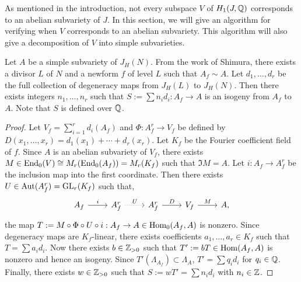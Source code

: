 \documentclass{article}
\begin{document}
As mentioned in the introduction, not every subspace $V$ of $H_1(J, \mathbb{Q})$
corresponds to an abelian subvariety of $J$. In this section, we will give an
algorithm for verifying when $V$ corresponds to an abelian subvariety. This
algorithm will also give a decomposition of $V$ into simple subvarieties.


\begin{proposition}
    \label{prop:integral_degen}
    Let $A$ be a simple subvariety of $J_H(N)$. From the work of Shimura,
    there exists a divisor $L$ of $N$ and a newform $f$ of level $L$ such that
    $A_f \sim A$. Let $d_1,\ldots,d_r$ be the full collection of degeneracy
    maps from $J_H(L)$ to $J_H(N)$. Then there exists integers $n_1,\ldots,n_r$
    such that $S:=\sum n_i d_i: A_f\to A$ is an isogeny from $A_f$ to $A$. Note
    that $S$ is defined over $\mathbb{Q}$.
\end{proposition}
\begin{proof}
    Let $V_f=\sum_{i=1} ^r d_i(A_f)$ and $\Phi:A_f ^r \to V_f$ be defined by
    $D(x_1,\ldots,x_r) = d_1(x_1)+\cdots+d_r(x_r)$. Let $K_f$ be the Fourier
    coefficient field of $f$. Since $A$ is an abelian subvariety of $V_f$, there
    exists $M\in \operatorname{End}_0(V)\cong M_r(\operatorname{End}_0(A_f)) = M_r (K_f)$ such that $\Im M
    = A$. Let $i:A_f\to A_f ^r$ be the inclusion map into the first coordinate.
    Then there exists $U\in \operatorname{Aut}(A_f ^r)=\operatorname{GL}_r (K_f)$ such that,
    \[
        \begin{tikzcd}
            A_f \arrow[r,"i"] &
            A_f ^r \arrow[r, dotted, "U"] &
            A_f ^r \arrow[r, "D"] &
            V_f \arrow[r, "M"] &
            A,
        \end{tikzcd}
    \]
    the map $T:=M \circ \Phi \circ U\circ i:A_f\to A\in \operatorname{Hom}_0(A_f, A)$ is
    nonzero. Since degeneracy maps are $K_f$-linear, there exists coefficients
    $a_1,\ldots,a_r\in K_f$ such that $T = \sum a_i d_i$. Now there exists
    $b\in \mathbb{Z}_{>0}$ such that $T':=bT\in \operatorname{Hom}(A_f, A)$ is nonzero and hence an
    isogeny. Since $T'(\Lambda_{A_f})\subset \Lambda_A$, $T'=\sum q_i d_i$
    for $q_i\in \mathbb{Q}$. Finally, there exists $w\in \mathbb{Z}_{>0}$ such that
    $S:=wT'=\sum n_i d_i$ with $n_i\in \mathbb{Z}$.
\end{proof}
\end{document}
